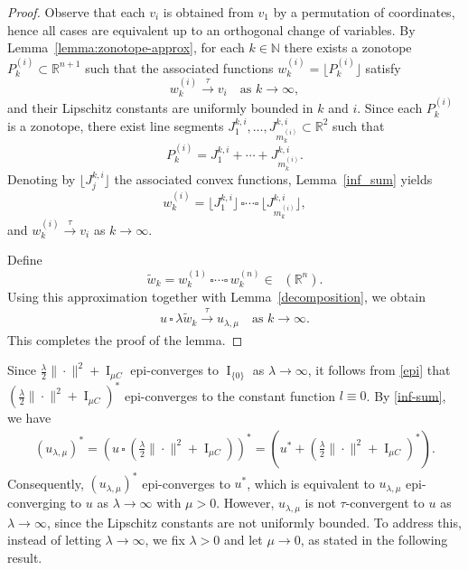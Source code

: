 \documentclass[11pt]{article}
\theoremstyle{definition} %
\DeclareMathOperator{\I}{I}
\DeclareMathOperator{\LP}{Conv_{lp}}
\newcommand{\seq}{\xrightarrow{\tau}}
\begin{document}
\begin{proof}
Observe that each $v_i$ is obtained from $v_1$ by a permutation of coordinates, hence all cases are equivalent up to an orthogonal change of variables. By Lemma~\ref{lemma:zonotope-approx}, for each $k\in\mathbb{N}$ there exists a zonotope $P_k^{(i)} \subset \mathbb{R}^{n+1}$ such that the associated functions $w_k^{(i)}=\lfloor P_k^{(i)} \rfloor$ satisfy
\[
w_k^{(i)} \seq v_i \quad \text{as } k\to\infty,
\]
and their Lipschitz constants are uniformly bounded in $k$ and $i$. Since each $P_k^{(i)}$ is a zonotope, there exist line segments $J_1^{k,i},\dots,J_{m_k^{(i)}}^{k,i}\subset\mathbb{R}^2$ such that
\[
P_k^{(i)} = J_1^{k,i}+\cdots+J_{m_k^{(i)}}^{k,i}.
\]
Denoting by $\lfloor J_j^{k,i}\rfloor$ the associated convex functions, Lemma~\ref{inf_sum} yields
\[
w_k^{(i)} = \lfloor J_1^{k,i} \rfloor \,\square \cdots \square\, \lfloor J_{m_k^{(i)}}^{k,i} \rfloor,
\]
and $w_k^{(i)} \seq v_i$ as $k\to\infty$.

Define
\[
\tilde{w}_k = w_k^{(1)}\,  \square \cdots \square \, w_k^{(n)}\in \LP(\mathbb{R}^n).
\]
Using this approximation together with Lemma~\ref{decomposition}, we obtain
\begin{align*}
u\,\square\, \lambda \tilde{w}_k \seq u_{\lambda,\mu} \quad \text{as } k\to \infty.
\end{align*}
This completes the proof of the lemma.
\end{proof}






Since $\frac{\lambda}{2}\|\cdot\|^2+\I_{\mu C}$ epi-converges to $\I_{\{0\}}$ as $\lambda\rightarrow \infty$, it follows from \eqref{epi} that  $\left(\frac{\lambda}{2}\|\cdot\|^2+\I_{\mu C}\right)^*$ epi-converges to the constant function $l\equiv 0$. By \eqref{inf-sum},  we have
\begin{align*}
    (u_{\lambda,\mu})^*= \left(u\,\square\, \left(\frac{\lambda}{2}\|\cdot\|^2+\I_{\mu C}\right)\right)^*= \left(u^*+\left(\frac{\lambda}{2}\|\cdot\|^2+\I_{\mu C}\right)^*\right).
\end{align*}
Consequently, $(u_{\lambda,\mu})^*$ epi-converges to $u^*$, which is equivalent to $u_{\lambda,\mu}$ epi-converging to $u$ as $\lambda\rightarrow \infty$ with $\mu>0$. However, $u_{\lambda,\mu}$ is  not $\tau$-convergent to $u$ as $\lambda\rightarrow \infty$, since the Lipschitz constants are not uniformly bounded. To address this, instead of letting $\lambda \to \infty$, we fix $\lambda>0$ and let $\mu\to 0$, as stated in the following result.
\end{document}
